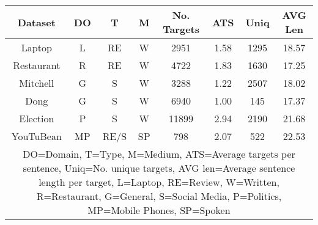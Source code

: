 \begin{tabular}{|c|c|c|c|c|c|c|c|}
\hline
Dataset & DO & T & M & No. Targets & ATS & Uniq & AVG Len \\
 \hline
Laptop & L & RE & W & 2951 & 1.58 & 1295 & 18.57  \\
\hline
Restaurant & R & RE & W & 4722 & 1.83 & 1630 & 17.25  \\
\hline
Mitchell & G & S & W & 3288 & 1.22 & 2507 & 18.02 \\
\hline
Dong & G & S & W & 6940 & 1.00 & 145 & 17.37 \\
\hline
Election & P & S & W & 11899 & 2.94 & 2190 & 21.68 \\
\hline
YouTuBean & MP & RE\slash S & SP & 798 & 2.07 & 522 & 22.53 \\
\hline
\multicolumn{8}{|p{0.95\linewidth}|}{DO=Domain, T=Type, M=Medium, ATS=Average targets per sentence, Uniq=No. unique targets, AVG len=Average sentence length per target, L=Laptop, RE=Review, W=Written, R=Restaurant, G=General,   S=Social Media, P=Politics, MP=Mobile Phones, SP=Spoken}\\
\hline
\end{tabular}

